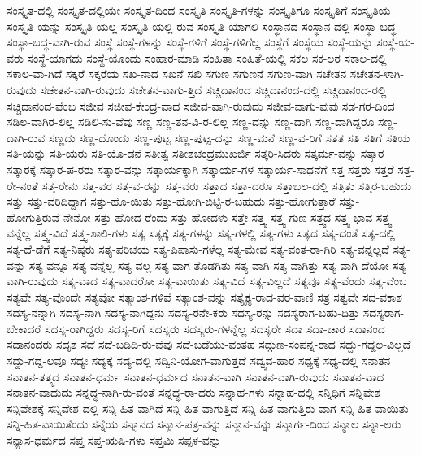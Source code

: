 {ಸಂಸ್ಕೃತ-ದಲ್ಲಿ
ಸಂಸ್ಕೃತ-ದಲ್ಲಿಯೇ
ಸಂಸ್ಕೃತ-ದಿಂದ
ಸಂಸ್ಕೃತಿ
ಸಂಸ್ಕೃತಿ-ಗಳನ್ನು
ಸಂಸ್ಕೃತಿಗೂ
ಸಂಸ್ಕೃತಿಗೆ
ಸಂಸ್ಕೃತಿಯ
ಸಂಸ್ಕೃತಿ-ಯನ್ನು
ಸಂಸ್ಕೃತಿ-ಯಲ್ಲ
ಸಂಸ್ಕೃತಿ-ಯಲ್ಲಿ-ರುವ
ಸಂಸ್ಕೃತಿ-ಯಾಗಲಿ
ಸಂಸ್ಥಾನದ
ಸಂಸ್ಥಾನ-ದಲ್ಲಿ
ಸಂಸ್ಥಾ-ಬದ್ಧ
ಸಂಸ್ಥಾ-ಬದ್ಧ-ವಾಗಿ-ರುವ
ಸಂಸ್ಥೆ
ಸಂಸ್ಥೆ-ಗಳನ್ನು
ಸಂಸ್ಥೆ-ಗಳಿಗೆ
ಸಂಸ್ಥೆ-ಗಳಿಗೆಲ್ಲ
ಸಂಸ್ಥೆಗೆ
ಸಂಸ್ಥೆಯ
ಸಂಸ್ಥೆ-ಯನ್ನು
ಸಂಸ್ಥೆ-ಯ-ವರು
ಸಂಸ್ಥೆ-ಯಾಗದು
ಸಂಸ್ಥೆ-ಯೊಂದು
ಸಂಹಾರ-ಮಾಡಿ
ಸಂಹಿತಾ
ಸಂಹಿತೆ-ಯಲ್ಲಿ
ಸಕಲ
ಸಕ-ಲರ
ಸಕಾಲ-ದಲ್ಲಿ
ಸಕಾಲ-ವಾ-ಗಿದೆ
ಸಕ್ಕರೆ
ಸಕ್ಕರೆಯ
ಸಖ-ನಾದ
ಸಖನೆ
ಸಖಿ
ಸಗುಣ
ಸಗುಣನೆ
ಸಗುಣ-ವಾಗಿ
ಸಚೇತನ
ಸಚೇತನ-ಳಾಗಿ-ರುವುದು
ಸಚೇತನ-ವಾಗಿ-ರುವುದು
ಸಚೇತನ-ವಾಗು-ತ್ತಿದೆ
ಸಚ್ಚಿದಾನಂದ
ಸಚ್ಚಿದಾನಂದ-ದಲ್ಲಿ
ಸಚ್ಚಿದಾನಂದ-ರಲ್ಲಿ
ಸಚ್ಚಿದಾನಂದ-ವೆಂಬ
ಸಜೀವ
ಸಜೀವ-ಕೇಂದ್ರ-ವಾದ
ಸಜೀವ-ವಾಗಿ-ರುವುದು
ಸಜೀವ-ವಾಗು-ವುವು
ಸಡ-ಗರ-ದಿಂದ
ಸಡಿಲ-ವಾಗಿರ-ಲಿಲ್ಲ
ಸಡಿಲಿ-ಸು-ವೆವು
ಸಣ್ಣ
ಸಣ್ಣ-ತನ-ವಿ-ರ-ಲಿಲ್ಲ
ಸಣ್ಣ-ದನ್ನು
ಸಣ್ಣ-ದಾಗಿ
ಸಣ್ಣ-ದಾಗಿದ್ದರೂ
ಸಣ್ಣ-ದಾಗಿ-ರುವ
ಸಣ್ಣದು
ಸಣ್ಣ-ದೊಂದು
ಸಣ್ಣ-ಪುಟ್ಟ
ಸಣ್ಣ-ಪುಟ್ಟ-ದನ್ನು
ಸಣ್ಣ-ಮನೆ
ಸಣ್ಣ-ವ-ರಿಗೆ
ಸತತ
ಸತಿ
ಸತಿಗೆ
ಸತಿಯ
ಸತಿ-ಯನ್ನು
ಸತಿ-ಯರು
ಸತಿ-ಯೊ-ಡನೆ
ಸತೀತ್ವ
ಸತೀಶಚಂದ್ರಮುಖರ್ಜಿ
ಸತ್ಕರಿ-ಸಿದರು
ಸತ್ಕರ್ಮ-ವನ್ನು
ಸತ್ಕಾರ
ಸತ್ಕಾರಕ್ಕೆ
ಸತ್ಕಾರ-ಪ-ರರು
ಸತ್ಕಾರ-ವನ್ನು
ಸತ್ಕಾರ್ಯಕ್ಕಾಗಿ
ಸತ್ಕಾರ್ಯ-ಗಳ
ಸತ್ಕಾರ್ಯ-ಸಾಧನೆಗೆ
ಸತ್ತ
ಸತ್ತರು
ಸತ್ತರೆ
ಸತ್ತ-ರೇ-ನಂತೆ
ಸತ್ತ-ರೇನು
ಸತ್ತ-ವರ
ಸತ್ತ-ವ-ರನ್ನು
ಸತ್ತ-ವರು
ಸತ್ತಾದ
ಸತ್ತಾ-ದರೂ
ಸತ್ತಾಬಲ-ದಲ್ಲಿ
ಸತ್ತಿತು
ಸತ್ತಿರ-ಬಹುದು
ಸತ್ತು
ಸತ್ತು-ವರಿದಿದ್ದಾಗ
ಸತ್ತು-ಹೊ-ಯಿತು
ಸತ್ತು-ಹೋಗಿ-ಬಿಟ್ಟಿ-ರ-ಬಹುದು
ಸತ್ತು-ಹೋಗುತ್ತಾರೆ
ಸತ್ತು-ಹೋಗುತ್ತಿರುವೆ-ನೇನೋ
ಸತ್ತು-ಹೋದ-ರೆಂದು
ಸತ್ತು-ಹೋದಳು
ಸತ್ತೇ
ಸತ್ತ್ವ
ಸತ್ತ್ವ-ಗುಣ
ಸತ್ತ್ವದ
ಸತ್ತ್ವ-ಭಾವ
ಸತ್ತ್ವ-ವನ್ನೆಲ್ಲ
ಸತ್ತ್ವ-ವಿದೆ
ಸತ್ತ್ವ-ಶಾಲಿ-ಗಳು
ಸತ್ಯ
ಸತ್ಯಕ್ಕೆ
ಸತ್ಯ-ಗಳನ್ನು
ಸತ್ಯ-ಗಳಲ್ಲಿ
ಸತ್ಯ-ಗಳು
ಸತ್ಯದ
ಸತ್ಯ-ದಂತೆ
ಸತ್ಯ-ದಲ್ಲಿ
ಸತ್ಯ-ದೆ-ಡೆಗೆ
ಸತ್ಯ-ನಿಷ್ಠರು
ಸತ್ಯ-ಪರಿಚಯ
ಸತ್ಯ-ಪಿಪಾಸು-ಗಳೆಲ್ಲ
ಸತ್ಯ-ಮೇವ
ಸತ್ಯ-ವಂತ-ರಾ-ಗಿರಿ
ಸತ್ಯ-ವನ್ನಲ್ಲದೆ
ಸತ್ಯ-ವನ್ನು
ಸತ್ಯ-ವನ್ನೂ
ಸತ್ಯ-ವನ್ನೆಲ್ಲ
ಸತ್ಯ-ವಲ್ಲ
ಸತ್ಯ-ವಾಗ-ತೊಡಗಿತು
ಸತ್ಯ-ವಾಗಿ
ಸತ್ಯ-ವಾಗಿತ್ತು
ಸತ್ಯ-ವಾಗಿ-ದೆಯೋ
ಸತ್ಯ-ವಾಗಿ-ರುವುದು
ಸತ್ಯ-ವಾದ
ಸತ್ಯ-ವಾದರೋ
ಸತ್ಯ-ವಾಯಿತು
ಸತ್ಯ-ವಿದೆ
ಸತ್ಯ-ವಿಲ್ಲದೆ
ಸತ್ಯವೂ
ಸತ್ಯ-ವೆಂದು
ಸತ್ಯ-ವೆಂಬ
ಸತ್ಯವೇ
ಸತ್ಯ-ವೊಂದೇ
ಸತ್ಯವೋ
ಸತ್ಯಾಂಶ-ಗಳಿವೆ
ಸತ್ಯಾಂಶ-ವನ್ನು
ಸತ್ಯೈಕ್ಯ-ರಾದ-ವರ-ವಾಣಿ
ಸತ್ರ
ಸತ್ವವೇ
ಸದ-ವಕಾಶ
ಸದಸ್ಯ-ನನ್ನಾಗಿ
ಸದಸ್ಯ-ನಾಗಿ
ಸದಸ್ಯ-ನಾಗಿದ್ದನು
ಸದಸ್ಯ-ರನೇ-ಕರು
ಸದಸ್ಯ-ರನ್ನು
ಸದಸ್ಯರಾಗ-ಬಹು-ದಿತ್ತು
ಸದಸ್ಯರಾಗ-ಬೇಕಾದರೆ
ಸದಸ್ಯ-ರಾಗಿದ್ದರು
ಸದಸ್ಯ-ರಿಗೆ
ಸದಸ್ಯರು
ಸದಸ್ಯರು-ಗಳನ್ನೆಲ್ಲ
ಸದಸ್ಯರೇ
ಸದಾ
ಸದಾ-ಚಾರ
ಸದಾನಂದ
ಸದಾನಂದರು
ಸದೃಶ
ಸದೆ
ಸದೆ-ಬಡಿದಿ-ರು-ವೆವು
ಸದೆ-ಬಡೆಯು-ವಂತಹ
ಸದ್ಗುಣ-ಸಂಪನ್ನ-ರಾದ
ಸದ್ದು-ಗದ್ದಲ-ವಿಲ್ಲದೆ
ಸದ್ದು-ಗದ್ದ-ಲವೂ
ಸದ್ಯಃ
ಸದ್ಯಕ್ಕೆ
ಸದ್ಯ-ದಲ್ಲಿ
ಸದ್ವಿನಿ-ಯೋಗ-ವಾಗುತ್ತದೆ
ಸದ್ವ್ಯವ-ಹಾರ
ಸಧ್ಯಕ್ಕೆ
ಸಧ್ಯ-ದಲ್ಲಿ
ಸನಾತನ
ಸನಾತನ-ತತ್ತ್ವದ
ಸನಾತನ-ಧರ್ಮ
ಸನಾತನ-ಧರ್ಮದ
ಸನಾತನ-ವಾಗಿ
ಸನಾತನ-ವಾಗಿ-ರುವುದು
ಸನಾತನ-ವಾದ
ಸನಾತನ-ವಾದುದು
ಸನ್ನದ್ಧ-ನಾಗಿ-ರು-ವಂತೆ
ಸನ್ನದ್ಧ-ರಾ-ದರು
ಸನ್ನಾಹ-ಗಳು
ಸನ್ನಾಹ-ದಲ್ಲಿ
ಸನ್ನಿಧಿಗೆ
ಸನ್ನಿವೇಶ
ಸನ್ನಿವೇಶಕ್ಕೆ
ಸನ್ನಿವೇಶ-ದಲ್ಲಿ
ಸನ್ನಿ-ಹಿತ-ವಾಗಿದೆ
ಸನ್ನಿ-ಹಿತ-ವಾಗುತ್ತಿದೆ
ಸನ್ನಿ-ಹಿತ-ವಾಗುತ್ತಿರು-ವಾಗ
ಸನ್ನಿ-ಹಿತ-ವಾಯಿತು
ಸನ್ನಿ-ಹಿತ-ವಾಯಿತೆಂದು
ಸನ್ನೆಯ
ಸನ್ಮಾನದ
ಸನ್ಮಾನ-ಪತ್ರ-ವನ್ನು
ಸನ್ಮಾನ-ವನ್ನು
ಸನ್ಮಾರ್ಗ-ದಿಂದ
ಸನ್ಯಾಲ
ಸನ್ಯಾ-ಲರು
ಸನ್ಯಾಸ-ಧರ್ಮದ
ಸಪ್ತ
ಸಪ್ತ-ಋಷಿ-ಗಳು
ಸಪ್ತಮಿ
ಸಪ್ಪಳ-ವನ್ನು
}
